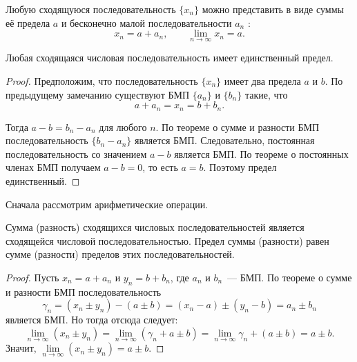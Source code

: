 \begin{note}
Любую сходящуюся последовательность \(\{x_{n}\}\) можно представить в виде суммы
её предела \(a\) и бесконечно малой последовательности \(a_{n}\) :
\[
x_{n} = a + a_{n}, \qquad \lim\limits_{n\to\infty}x_{n} = a.
\]
\end{note}

\begin{theorem}
Любая сходящаяся числовая последовательность имеет единственный предел.

\begin{proof}
Предположим, что последовательность \(\{x_{n}\}\) имеет
два предела \(a\) и \(b\). По предыдущему замечанию существуют БМП
\(\{a_{n}\}\) и \(\{b_{n}\}\) такие, что
\[
a + a_{n} = x_{n} = b+ b_{n}.
\]

Тогда \(a - b = b_{n} - a_{n}\) для любого \(n\). По теореме о сумме и
разности БМП последовательность \(\{b_{n} - a_{n}\}\) является БМП.
Следовательно, постоянная последовательность со значением \(a - b\)
является БМП. По теореме о постоянных членах БМП получаем \(a - b = 0\),
то есть \(a = b\). Поэтому предел единственный.
\end{proof}
\end{theorem}

 \label{subsection_lim_arithmetic}

Сначала рассмотрим арифметические операции.

\begin{theorem}
Сумма (разность) сходящихся числовых последовательностей является
сходящейся числовой последовательностью. Предел суммы (разности)
равен сумме (разности) пределов этих последовательностей.

\begin{proof}
Пусть \(x_{n} = a + a_{n}\) и \(y_{n} = b + b_{n}\), где \(a_{n}\) и \(b_{n}\)~--- БМП.
По теореме о сумме и разности БМП последовательность
\[
\gamma_{n} = (x_{n} \pm y_{n}) - (a \pm b) = (x_{n} - a) \pm (y_{n} - b) = a_{n} \pm b_{n}
\]
является БМП. Но тогда отсюда следует:
\[
\lim_{ n \to \infty } (x_{n} \pm y_{n}) =
\lim_{ n \to \infty } (\gamma_{n} + a \pm b) =
\lim_{ n \to \infty } \gamma_{n} + (a \pm b) = a \pm b.
\]
Значит, \(\lim\limits_{n\to\infty}(x_{n}\pm y_{n})=a\pm b\).
\end{proof}
\end{theorem}

